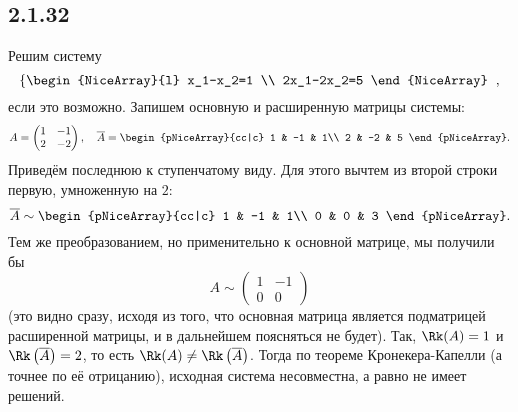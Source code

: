 \subsection{2.1.32}

Решим систему
\[
\left\{
\begin{NiceArray}{l}
	x_1-x_2=1 \\
	2x_1-2x_2=5
\end{NiceArray}
\right.\;,
\]
если это возможно. Запишем основную и расширенную матрицы системы:
\[
A=
\begin{pmatrix}
	1 & -1 \\
	2 & -2
\end{pmatrix}
,\quad \overline{A}=
\begin{pNiceArray}{cc|c}
	1 & -1 & 1\\
	2 & -2 & 5
\end{pNiceArray}.
\]
Приведём последнюю к ступенчатому виду. Для этого вычтем из второй строки первую, умноженную на $2$:
\[
\overline{A}\sim
\begin{pNiceArray}{cc|c}
	1 & -1 & 1\\
	0 & 0 & 3
\end{pNiceArray}.
\]
Тем же преобразованием, но применительно к основной матрице, мы получили бы
\[
A\sim
\begin{pmatrix}
	1 & -1 \\
	0 & 0
\end{pmatrix}
\]
(это видно сразу, исходя из того, что основная матрица является подматрицей расширенной матрицы, и в дальнейшем поясняться не будет). Так, $\Rk(A)=1$ и $\Rk\left(\overline{A}\right)=2$, то есть $\Rk(A)\neq\Rk\left(\overline{A}\right)$. Тогда по теореме Кронекера-Капелли (а точнее по её отрицанию), исходная система несовместна, а равно не имеет решений.